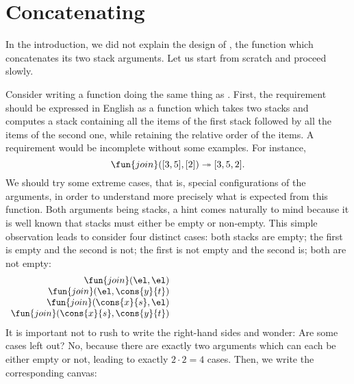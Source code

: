 \section{Concatenating}

In the introduction, we did not explain the design of , the
function which concatenates its two stack arguments. Let us start from
scratch and proceed slowly.

Consider writing a function  doing the same thing as
. First, the requirement should be expressed in English as
a function which takes two stacks and computes a stack containing all
the items of the first stack followed by all the items of the second
one, while retaining the relative order of the items. A requirement
would be incomplete without some examples. For instance,
\begin{equation*}
\fun{join}([3,5],[2]) \twoheadrightarrow [3,5,2].
\end{equation*}
We should try some extreme cases, that is, special configurations of
the arguments, in order to understand more precisely what is expected
from this function. Both arguments being stacks, a hint comes
naturally to mind because it is well known that stacks must either be
empty or non\hyp{}empty. This simple observation leads to consider
four distinct cases: both stacks are empty; the first is empty and the
second is not; the first is not empty and the second is; both are not
empty:
\begin{equation*}
\begin{array}{r@{\;}l@{\;}l}
\fun{join}(\el,\el) & \phantom{\rightarrow} & \phantom{\el;}\\
\fun{join}(\el,\cons{y}{t}) & \phantom{\rightarrow} & \phantom{\cons{y}{t};}\\
\fun{join}(\cons{x}{s},\el) & \phantom{\rightarrow} & \phantom{\cons{x}{s};}\\
\fun{join}(\cons{x}{s},\cons{y}{t}) & \phantom{\rightarrow} &
  \phantom{\cons{x}{\fun{join}(s,\cons{y}{t})}.}
\end{array}
\end{equation*}
It is important not to rush to write the right\hyp{}hand sides and
wonder: Are some cases left out? No, because there are exactly two
arguments which can each be either empty or not, leading to exactly
\(2 \cdot 2 = 4\) cases. Then, we write the corresponding canvas:
